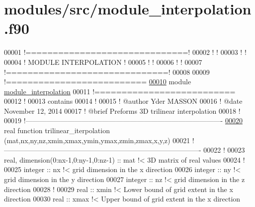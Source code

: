 \hypertarget{module__interpolation_8f90_source}{
\section{modules/src/module\-\_\-interpolation.f90}
}

\begin{DoxyCode}
00001 \textcolor{comment}{!==============================!}
00002 \textcolor{comment}{!                              !}
00003 \textcolor{comment}{!                              !}
00004 \textcolor{comment}{!     MODULE INTERPOLATION     !}
00005 \textcolor{comment}{!                              !}
00006 \textcolor{comment}{!                              !}
00007 \textcolor{comment}{!==============================!}
00008 
00009 \textcolor{comment}{!==========================}
\hypertarget{module__interpolation_8f90_source_l00010}{}\hyperlink{classmodule__interpolation}{00010} \textcolor{keyword}{module} \hyperlink{classmodule__interpolation}{module_interpolation}
00011 \textcolor{comment}{!==========================}
00012 \textcolor{comment}{!}
00013 \textcolor{keyword}{contains}
00014 \textcolor{comment}{!}
00015 \textcolor{comment}{! @author Yder MASSON}
00016 \textcolor{comment}{! @date November 12, 2014}
00017 \textcolor{comment}{! @brief Preforms 3D trilinear interpolation }
00018 \textcolor{comment}{!}
00019 \textcolor{comment}{
      !-------------------------------------------------------------------------------------}
\hypertarget{module__interpolation_8f90_source_l00020}{}\hyperlink{classmodule__interpolation_ace479a4b690efc96c08cc306efbc089c}{00020} \textcolor{keyword}{real }\textcolor{keyword}{function }trilinear\_iterpolation
      (mat,nx,ny,nz,xmin,xmax,ymin,ymax,zmin,zmax,x,y,z)
00021 \textcolor{comment}{
      !-------------------------------------------------------------------------------------}
00022 \textcolor{comment}{!}
00023 \textcolor{keywordtype}{real}, \textcolor{keywordtype}{dimension(0:nx-1,0:ny-1,0:nz-1)} :: mat \textcolor{comment}{!< 3D matrix of real values }
00024 \textcolor{comment}{!}
00025 \textcolor{keywordtype}{integer} :: nx \textcolor{comment}{!< grid dimension in the x direction}
00026 \textcolor{keywordtype}{integer} :: ny \textcolor{comment}{!< grid dimension in the y direction}
00027 \textcolor{keywordtype}{integer} :: nz \textcolor{comment}{!< grid dimension in the z direction}
00028 \textcolor{comment}{!}
00029 \textcolor{keywordtype}{real} :: xmin \textcolor{comment}{!< Lower bound of grid extent in the x direction}
00030 \textcolor{keywordtype}{real} :: xmax \textcolor{comment}{!< Upper bound of grid extent in the x direction }

\end{DoxyCode}
